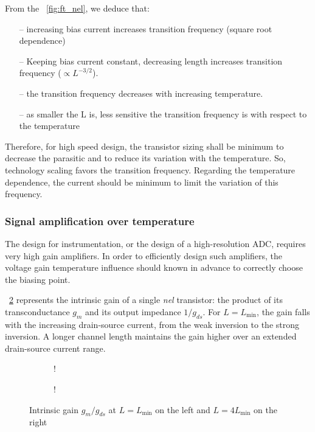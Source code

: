 From the \figurename~\ref{fig:ft_nel}, we deduce that:
\begin{itemize}
	\item[--] increasing bias current increases transition frequency (square root dependence)
	\item[--] Keeping bias current constant, decreasing length increases transition frequency (\(\propto L^{-3/2}\)).
	\item[--] the transition frequency decreases with increasing temperature.
	\item[--] as smaller the L is, less sensitive the transition frequency is with respect to the temperature
\end{itemize}
Therefore, for high speed design, the transistor sizing shall be minimum to decrease the parasitic and to reduce its variation with the temperature. So, technology scaling favors the transition frequency. Regarding the temperature dependence, the current should be minimum to limit the variation of this frequency.

\subsubsection{Signal amplification over temperature}
\label{sec:des_accuracy}
The design for instrumentation, or the design of a high-resolution ADC, requires very high gain amplifiers. In order to efficiently design such amplifiers, the voltage gain temperature influence should known in advance to correctly choose the biasing point.

\figurename~\ref{fig:Av_nel} represents the intrinsic gain of a single \emph{nel} transistor: the product of its transconductance \(g_m \) and its output impedance \(1/g_{ds} \). For \(L = L_{\min} \), the gain falls with the increasing drain-source current, from the weak inversion to the strong inversion. A longer channel length maintains the gain higher over an extended drain-source current range.
\begin{figure}[!ht]
	\centering
	\begin{subfigure}[b]{0.48\textwidth}
		\resizebox {\textwidth} {!} { 
			
		}
	\end{subfigure}
	\begin{subfigure}[b]{0.48\textwidth}
		\resizebox {\textwidth} {!} { 
			
		}
		\label{fig:Av_nel_sensitivity}
	\end{subfigure}
	\caption{Intrinsic gain \(g_m/g_{ds} \) at \(L = L_{\min}\) on the left and \(L = 4 L_{\min}\) on the right}
	\label{fig:Av_nel}
\end{figure}

